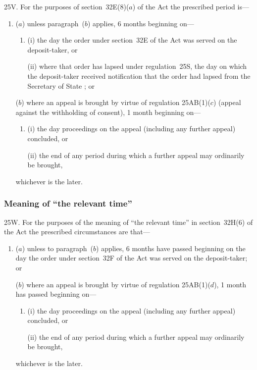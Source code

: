 \documentclass[12pt,a4paper]{article}
\begin{document}
25V.  For the purposes of section~32E(8)($a$)  of the Act the prescribed period is—
\begin{enumerate}\item[]
($a$) unless paragraph~($b$)  applies, 6 months beginning on—
\begin{enumerate}\item[]
(i) the day the order under section~32E of the Act was served on the deposit-taker, or

(ii) where that order has lapsed under regulation~25S, the day on which the deposit-taker received notification that the order had lapsed from the 
Secretary of State%
; or
\end{enumerate}

\begin{sloppypar}
($b$) where an appeal is brought by virtue of regulation 25AB(1)($c$)  (appeal against the withholding of consent), 1 month beginning on—
\end{sloppypar}
\begin{enumerate}\item[]
(i) the day proceedings on the appeal (including any further appeal) concluded, or

(ii) the end of any period during which a further appeal may ordinarily be brought,
\end{enumerate}
whichever is the later.
\end{enumerate}


\subsubsection[25W. Meaning of “the relevant time”]{Meaning of “the relevant time”}

25W.  For the purposes of the meaning of “the relevant time” in section~32H(6) of the Act the prescribed circumstances are that—
\begin{enumerate}\item[]
($a$) unless to paragraph~($b$)  applies, 6 months have passed beginning on the day the order under section~32F of the Act was served on the deposit-taker; or

\begin{sloppypar}
($b$) where an appeal is brought by virtue of regulation 25AB(1)($d$), 1 month has passed beginning on—
\end{sloppypar}
\begin{enumerate}\item[]
(i) the day proceedings on the appeal (including any further appeal) concluded, or

(ii) the end of any period during which a further appeal may ordinarily be brought,
\end{enumerate}
whichever is the later.
\end{enumerate}
\end{document}
